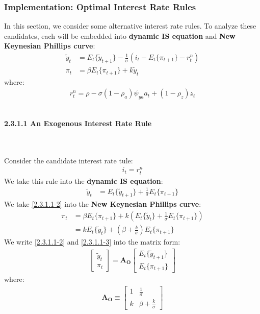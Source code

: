 \documentclass{article}
\numberwithin{equation}{section}
\begin{document}
\subsubsection{Implementation: Optimal Interest Rate Rules}
In this section, we consider some alternative interest rate rules. To analyze these candidates, each will be embedded into \textbf{dynamic IS equation} and \textbf{New Keynesian Phillips curve}:
	\begin{align*}
		\tilde{y}_t &= E_t\{\tilde{y}_{t+1}\} - \frac{1}{\sigma}(i_t - E_t\{\pi_{t+1}\} - r^n_t)\\
		\pi_t &= \beta E_t\{\pi_{t+1}\} + k\tilde{y}_t
	\end{align*}
 where:
 	\begin{align*}
 		r^n_t = \rho - \sigma(1 - \rho_a)\psi_{ya}a_t + (1 - \rho_z)z_t
 	\end{align*}
\\
\centerline{\textbf{2.3.1.1 An Exogenous Interest Rate Rule}}\\\\
Consider the candidate interest rate tule:
	\begin{align}
		i_t = r^n_t \label{2.3.1.1-1}
	\end{align}
We take this rule into the \textbf{dynamic IS equation}:
	\begin{align}
		\tilde{y}_t &= E_t\{\tilde{y}_{t+1}\} + \frac{1}{\sigma} E_t\{\pi_{t+1}\} \label{2.3.1.1-2}
	\end{align}	
We take \eqref{2.3.1.1-2} into the \textbf{New Keynesian Phillips curve}:
	\begin{align}
		\pi_t &= \beta E_t\{\pi_{t+1}\} + k \left(E_t\{\tilde{y}_t\} + \frac{1}{\sigma} E_t\{\pi_{t+1}\}\right) \nonumber\\
		&= k E_t\{\tilde{y}_t\} + \left(\beta + \frac{k}{\sigma}\right) E_t\{\pi_{t+1}\} \label{2.3.1.1-3} 
	\end{align}
We write \eqref{2.3.1.1-2} and \eqref{2.3.1.1-3} into the matrix form:
	\begin{align}
		\begin{bmatrix}
			\tilde{y}_t\\
			\pi_t
		\end{bmatrix} = \boldsymbol{A_O}
		\begin{bmatrix}
			E_t\{\tilde{y}_{t+1}\}\\
			E_t\{\pi_{t+1}\}
		\end{bmatrix} \label{2.3.1.1-4}
	\end{align}
where:
	\begin{align*}
		\boldsymbol{A_O} \equiv
		\begin{bmatrix}
			1 & \frac{1}{\sigma}\\
			k & \beta + \frac{k}{\sigma}
		\end{bmatrix}
	\end{align*}	
\end{document}
